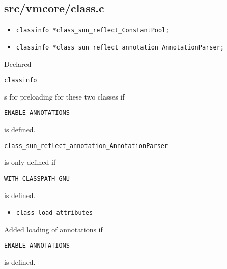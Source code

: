 \documentclass[a4paper, 10pt, titlepage]{scrartcl} %
\begin{document}
\subsection{src/vmcore/class.c}
\label{sec:src/vmcore/class.c}

\begin{itemize}
 \item \begin{scriptsize}\verb|classinfo|\hspace{0.0pt}\verb| |\hspace{0.0pt}\verb||\hspace{0.0pt}\verb|*|\hspace{0.0pt}\verb|class_sun_reflect_ConstantPool|\hspace{0.0pt}\verb|;|\hspace{0.0pt}\verb||\end{scriptsize}
 \item \begin{scriptsize}\verb|classinfo|\hspace{0.0pt}\verb| |\hspace{0.0pt}\verb||\hspace{0.0pt}\verb|*|\hspace{0.0pt}\verb|class_sun_reflect_annotation_AnnotationParser|\hspace{0.0pt}\verb|;|\hspace{0.0pt}\verb||\end{scriptsize}
\end{itemize}
Declared \begin{scriptsize}\verb|classinfo|\end{scriptsize}s for preloading for these two classes if
\begin{scriptsize}\verb|ENABLE_ANNOTATIONS|\end{scriptsize} is defined.

\begin{scriptsize}\verb|class_sun_reflect_annotation_AnnotationParser|\end{scriptsize} is only defined if
\begin{scriptsize}\verb|WITH_CLASSPATH_GNU|\end{scriptsize} is defined.

\begin{itemize}
 \item \begin{scriptsize}\verb|class_load_attributes|\end{scriptsize}
\end{itemize}
Added loading of annotations if \begin{scriptsize}\verb|ENABLE_ANNOTATIONS|\end{scriptsize} is defined.
\end{document}
